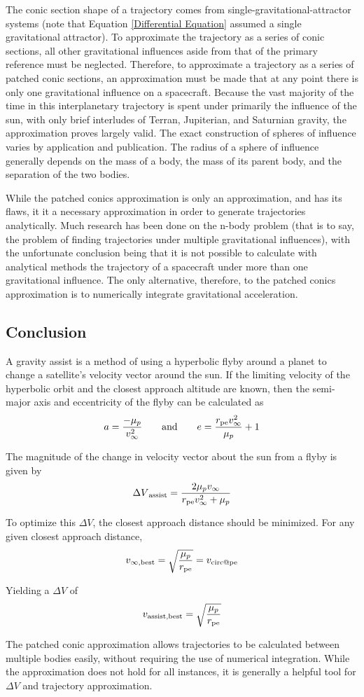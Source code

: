\documentclass[../basicOrbitalDynamics.tex]{subfiles}
\begin{document}
The conic section shape of a trajectory comes from single-gravitational-attractor systems (note that Equation \eqref{Differential Equation} assumed a single gravitational attractor). To approximate the trajectory as a series of conic sections, all other gravitational influences aside from that of the primary reference must be neglected. Therefore, to approximate a trajectory as a series of patched conic sections, an approximation must be made that at any point there is only one gravitational influence on a spacecraft. Because the vast majority of the time in this interplanetary trajectory is spent under primarily the influence of the sun, with only brief interludes of Terran, Jupiterian, and Saturnian gravity, the approximation proves largely valid. The exact construction of spheres of influence varies by application and publication. The radius of a sphere of influence generally depends on the mass of a body, the mass of its parent body, and the separation of the two bodies.

While the patched conics approximation is only an approximation, and has its flaws, it it a necessary approximation in order to generate trajectories analytically. Much research has been done on the n-body problem (that is to say, the problem of finding trajectories under multiple gravitational influences), with the unfortunate conclusion being that it is not possible to calculate with analytical methods the trajectory of a spacecraft under more than one gravitational influence. The only alternative, therefore, to the patched conics approximation is to numerically integrate gravitational acceleration.

\bigskip\bigskip
\subsection{Conclusion}

A gravity assist is a method of using a hyperbolic flyby around a planet to change a satellite's velocity vector around the sun. If the limiting velocity of the hyperbolic orbit and the closest approach altitude are known, then the semi-major axis and eccentricity of the flyby can be calculated as
\[a=\frac{-\mu_p}{v_\infty^2}\qquad\text{and}\qquad e=\frac{{r}_\text{pe}v_\infty^2}{\mu_p}+1\]

The magnitude of the change in velocity vector about the sun from a flyby is given by
\[{\Delta V}_\text{assist}=\frac{2\mu_p v_\infty}{{r}_\text{pe}v_\infty^2+\mu_p}\]

To optimize this $\Delta V$, the closest approach distance should be minimized. For any given closest approach distance,
\[v_{\infty,\text{best}}=\sqrt{\frac{\mu_p}{{r}_\text{pe}}}={v}_\text{circ@pe}\]

Yielding a $\Delta V$ of
\[{v}_\text{assist,best} = \sqrt{\frac{\mu_p}{{r}_\text{pe}}}\]

The patched conic approximation allows trajectories to be calculated between multiple bodies easily, without requiring the use of numerical integration. While the approximation does not hold for all instances, it is generally a helpful tool for $\Delta V$ and trajectory approximation.
\end{document}
